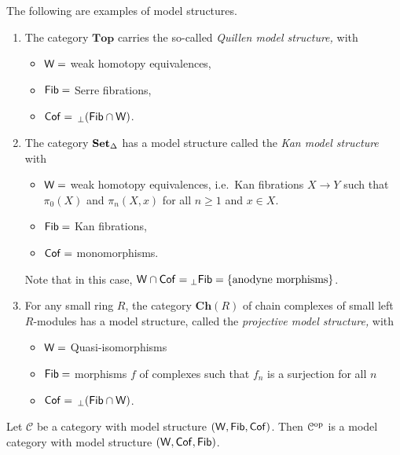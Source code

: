 \documentclass[main.tex]{subfiles}
\begin{document}
\begin{example}
  \label{eg:model_categories}
  The following are examples of model structures.
  \begin{enumerate}
    \item The category $\mathbf{Top}$ carries the so-called \emph{Quillen model structure,} with
      \begin{itemize}
        \item $\mathsf{W} =$ weak homotopy equivalences,

        \item $\mathsf{Fib} =$ Serre fibrations,

        \item $\mathsf{Cof} =$ ${}_{\perp}(\mathsf{Fib} \cap \mathsf{W})$.
      \end{itemize}

    \item The category $\operatorname{\mathbf{Set}_{\Delta}}$ has a model structure called the \emph{Kan model structure} with
      \begin{itemize}
        \item $\mathsf{W} =$ weak homotopy equivalences, i.e.\ Kan fibrations $X \to Y$ such that $\pi_{0}(X)$ and $\pi_{n}(X, x)$ for all $n \geq 1$ and $x \in X$.

        \item $\mathsf{Fib} =$ Kan fibrations,

        \item $\mathsf{Cof} =$ monomorphisms.
      \end{itemize}

      Note that in this case, $\mathsf{W} \cap \mathsf{Cof} = {}_{\perp}\mathsf{Fib} = \{\text{anodyne morphisms}\}$.

    \item For any small ring $R$, the category $\mathbf{Ch}(R)$ of chain complexes of small left $R$-modules has a model structure, called the \emph{projective model structure,} with
      \begin{itemize}
        \item $\mathsf{W} = $ Quasi-isomorphisms

        \item $\mathsf{Fib} = $ morphisms $f$ of complexes such that $f_{n}$ is a surjection for all $n$

        \item $\mathsf{Cof} =$ ${}_{\perp}(\mathsf{Fib} \cap \mathsf{W})$.
      \end{itemize}
  \end{enumerate}
\end{example}

\begin{example}
  \label{eg:opposite_model_category}
  Let $\mathcal{C}$ be a category with model structure $(\mathsf{W}, \mathsf{Fib}, \mathsf{Cof})$. Then $\mathcal{C}^{\mathrm{op}}$ is a model category with model structure $(\mathsf{W}, \mathsf{Cof}, \mathsf{Fib})$.
\end{example}
\end{document}
